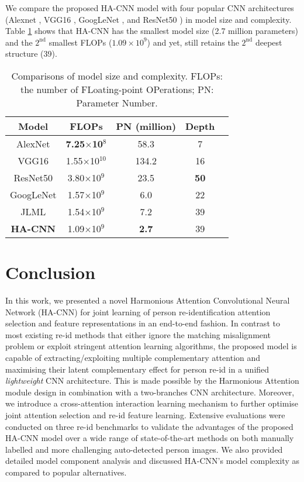 \documentclass[10pt,twocolumn,letterpaper]{article}
\begin{document}
\vspace{0.2cm}
We compare the proposed HA-CNN model with 
four popular CNN architectures
(Alexnet \cite{krizhevsky2012imagenet},
VGG16 \cite{simonyan2014very},
GoogLeNet \cite{szegedy2015going}, and
ResNet50 \cite{he2016deep}) in model size and complexity.
Table \ref{tab:base_nets} shows that 
HA-CNN has the smallest model size (2.7 million parameters) 
and the $2^\text{nd}$ smallest FLOPs ($1.09\!\times\! 10^9$)
and yet, still retains the $2^\text{nd}$ deepest structure (39).

\begin{table} [!h]
	\centering
\renewcommand{\arraystretch}{1}
	\setlength{\tabcolsep}{0.2 cm}
	\vspace{-0.3cm}
	\caption{ Comparisons of model size and complexity.
		FLOPs: the number of FLoating-point OPerations;
		PN: Parameter Number.
	}
\begin{tabular}{|c||c|c|c|c|}
		\hline
		Model  & FLOPs & PN (million) & Depth 
		\\ \hline
		AlexNet \cite{krizhevsky2012imagenet}
		& \bf 7.25$\times$10$^8$ & 58.3 & 7  \\ VGG16 \cite{simonyan2014very}
		&1.55$\times$10$^{10}$ & 134.2 & 16  \\ ResNet50 \cite{he2016deep}
		& 3.80$\times$10$^9$ & 23.5 & \bf 50 \\ GoogLeNet \cite{szegedy2015going}
		& 1.57$\times$10$^9$ & 6.0 & 22  \\  JLML &1.54$\times$10$^9$ & 7.2 & 39 \\ 
		\hline
\bf HA-CNN &1.09$\times$10$^9$ & \bf 2.7 & 39 \\ \hline
	\end{tabular}\label{tab:base_nets}
	\vspace{-0.35cm}
\end{table}

\section{Conclusion}
In this work, we presented a novel Harmonious Attention Convolutional Neural Network (HA-CNN)
for joint learning of person re-identification attention selection and feature representations
in an end-to-end fashion.
In contrast to most existing re-id methods
that either ignore the matching misalignment problem or 
exploit stringent attention learning algorithms, 
the proposed model is capable of extracting/exploiting multiple
complementary attention and maximising their latent complementary effect 
for person re-id in a unified {\em lightweight} CNN architecture.
This is made possible by the Harmonious Attention module design
in combination with a two-branches CNN architecture.
Moreover, we introduce a cross-attention interaction learning mechanism
to further optimise joint attention selection and re-id feature
learning.
Extensive evaluations were conducted on three re-id benchmarks to validate the advantages of
the proposed HA-CNN model over a wide range of state-of-the-art methods 
on both manually labelled and more challenging auto-detected person images.
We also provided detailed model component analysis and
discussed HA-CNN's model complexity as compared to popular alternatives.

{\small


}
\end{document}
